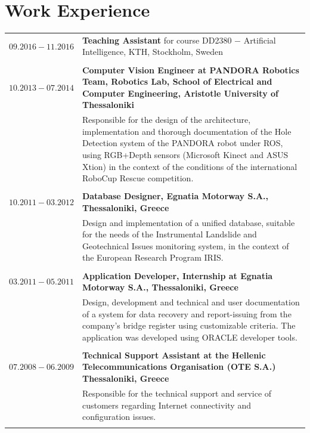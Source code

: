 \documentclass[a4paper,10pt,twoside]{article}
\begin{document}

\section{Work Experience}


\begin{tabular}{rp{11cm}}
$09.2016 - 11.2016$ & \textbf{Teaching Assistant} for course DD2380 $-$ Artificial Intelligence, KTH, Stockholm, Sweden\\
&\\
$10.2013 -07.2014$ & \textbf{Computer Vision Engineer at PANDORA Robotics Team, Robotics Lab,
School of Electrical and Computer Engineering, Aristotle University of Thessaloniki} \\
& \small{Responsible for the design of the architecture, implementation and thorough documentation of the Hole Detection system of the PANDORA robot under ROS,
using RGB+Depth sensors (Microsoft Kinect and ASUS Xtion) in the context of the conditions of the international RoboCup Rescue competition.}\\
\multicolumn{2}{c}{} \\


$10.2011 - 03.2012$ & \textbf{Database Designer, Egnatia Motorway S.A., Thessaloniki, Greece} \\
& \small{Design and implementation of a unified database, suitable for the needs of the
Instrumental Landslide and Geotechnical Issues
monitoring system, in the context of the European Research Program IRIS.
}\\
\multicolumn{2}{c}{} \\


$03.2011 - 05.2011$ & \textbf{Application Developer, Internship at Egnatia Motorway S.A., Thessaloniki, Greece}\\
& \small{Design, development and technical and user documentation of a system for data
recovery and report-issuing from the company's bridge register using
customizable criteria. The application was developed using ORACLE developer tools.
}\\
\multicolumn{2}{c}{} \\


$07.2008 - 06.2009$ & \textbf{Technical Support Assistant at the Hellenic Telecommunications
Organisation (OTE S.A.) Thessaloniki, Greece}\\
& \small{Responsible for the technical support and service of customers regarding Internet connectivity and configuration
issues.}\\
&\\
\end{tabular}
\end{document}
